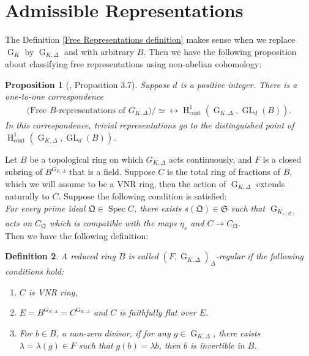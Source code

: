 \documentclass{amsart}
\newtheorem{proposition}{Proposition}[section]
\newtheorem{definition}[proposition]{Definition}
\DeclareMathOperator{\spec}{Spec}
\DeclareMathOperator{\cH}{H}
\DeclareMathOperator{\G}{G}
\DeclareMathOperator{\GL}{GL}
\begin{document}

\section{Admissible Representations}\label{Admissible Representations}

 The Definition \ref{Free Representations definition} makes sense when we replace $\G_K$ by $\G_{K,\Delta}$ and with arbitrary $B$. Then we have the following proposition about classifying free representations using non-abelian cohomology:

\begin{proposition}[\cite{Fontaine}, Proposition 3.7]
    Suppose $d$ is a positive integer. There is a one-to-one correspondence 
    \begin{align*}
        \text{(Free $B$-representations of $G_{K,\Delta}$)}/\simeq\leftrightarrow \cH^1_{\text{cont}}(\G_{K,\Delta},\GL_d(B)).
    \end{align*}
    In this correspondence, trivial representations go to the distinguished point of $\cH^1_{\text{cont}}(\G_{K,\Delta},\GL_d(B))$.
\end{proposition}

Let $B$ be a topological ring on which $G_{K,\Delta}$ acts continuously, and $F$ is a closed subring of $B^{G_{K,\Delta}}$ that is a field. Suppose $C$ is the total ring of fractions of $B$, which we will assume to be a VNR ring, then the action of $\G_{K,\Delta}$ extends naturally to $C$. Suppose the following condition is satisfied:\\

\emph{For every prime ideal $\mathfrak{Q}\in\spec C$, there exists $s(\mathfrak{Q})\in\mathfrak{S}$ such that $\G_{K_{s(\mathfrak{Q})}}$ acts on $C_{\mathfrak{Q}}$ which is compatible with the maps $\eta_s$ and $C\to C_{\mathfrak{Q}}$}.\\

Then we have the following definition:

\begin{definition}
    A reduced ring $B$ is called \emph{$(F,\G_{K,\Delta})_\Delta$-regular} if the following conditions hold:
    \begin{enumerate}
        \item[(i)] $C$ is VNR ring,
        \item[(ii)] $E=B^{G_{K,\Delta}}=C^{\G_{K,\Delta}}$ and $C$ is faithfully flat over $E$.
        \item[(iii)] For $b\in B$, a non-zero divisor, if for any $g\in\G_{K,\Delta}$, there exists $\lambda=\lambda(g)\in F$ such that $g(b)=\lambda b$, then $b$ is invertible in $B$.
    \end{enumerate}
\end{definition}
\end{document}
